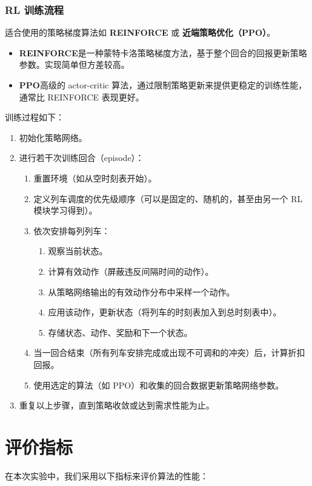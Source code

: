 \documentclass{article}
\begin{document}
    \subsubsection{RL 训练流程}
    适合使用的策略梯度算法如 \textbf{REINFORCE} 或 \textbf{近端策略优化（PPO）}。
    \begin{itemize}
        \item \textbf{REINFORCE}是一种蒙特卡洛策略梯度方法，基于整个回合的回报更新策略参数。实现简单但方差较高。
        \item \textbf{PPO}高级的 actor-critic 算法，通过限制策略更新来提供更稳定的训练性能，通常比 REINFORCE 表现更好。
    \end{itemize}
    训练过程如下：
    \begin{enumerate}
        \item 初始化策略网络。
        \item 进行若干次训练回合（episode）：
        \begin{enumerate}
            \item 重置环境（如从空时刻表开始）。
            \item 定义列车调度的优先级顺序（可以是固定的、随机的，甚至由另一个 RL 模块学习得到）。
            \item 依次安排每列列车：
            \begin{enumerate}
                \item 观察当前状态。
                \item 计算有效动作（屏蔽违反间隔时间的动作）。
                \item 从策略网络输出的有效动作分布中采样一个动作。
                \item 应用该动作，更新状态（将列车的时刻表加入到总时刻表中）。
                \item 存储状态、动作、奖励和下一个状态。
            \end{enumerate}
            \item 当一回合结束（所有列车安排完成或出现不可调和的冲突）后，计算折扣回报。
            \item 使用选定的算法（如 PPO）和收集的回合数据更新策略网络参数。
        \end{enumerate}
        \item 重复以上步骤，直到策略收敛或达到需求性能为止。
    \end{enumerate}


    \section{评价指标}
    在本次实验中，我们采用以下指标来评价算法的性能：
\end{document}
